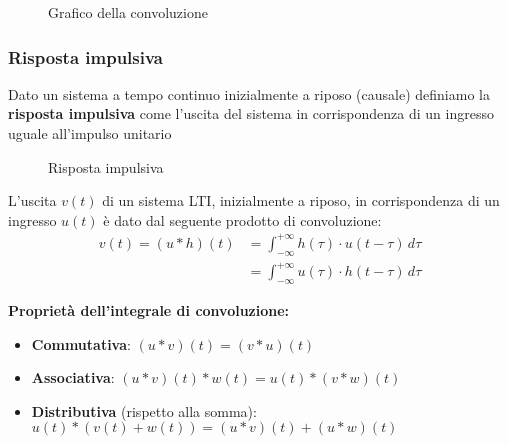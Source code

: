 \documentclass[a4paper]{article}
\begin{document}
\begin{example}
\begin{figure}[H]
    \caption{Grafico della convoluzione}
  \end{figure}
\end{example}

\subsubsection{Risposta impulsiva}
\begin{definition}
  Dato un sistema a tempo continuo inizialmente a riposo (causale) definiamo la 
  \textbf{risposta impulsiva} come l'uscita del sistema in corrispondenza di un ingresso
  uguale all'impulso unitario
  \begin{figure}[H]
    \centering
    \caption{Risposta impulsiva}
  \end{figure}
\end{definition}

\begin{theorem}
  L'uscita \( v(t) \) di un sistema LTI, inizialmente a riposo, in corrispondenza di un
  ingresso \( u(t) \) è dato dal seguente prodotto di convoluzione:
  \[
    \begin{aligned}
      v(t) = (u \ast h)(t) &= \int_{-\infty}^{+\infty} h(\tau) \cdot u(t-\tau) \, d\tau\\
                           &= \int_{-\infty}^{+\infty} u(\tau) \cdot h(t-\tau) \, d\tau
    \end{aligned}
  \] 
\end{theorem}

\noindent
\textbf{Proprietà dell'integrale di convoluzione:}
\begin{itemize}
  \item \textbf{Commutativa}: \( (u \ast v)(t) = (v \ast u)(t) \) 
  \item \textbf{Associativa}: \( (u \ast v)(t) \ast w(t) = u(t) \ast (v \ast w)(t) \)
  \item \textbf{Distributiva} (rispetto alla somma): \( u(t) \ast (v(t) + w(t)) = (u \ast v)(t) + (u \ast w)(t) \)
\end{itemize}
\end{document}
